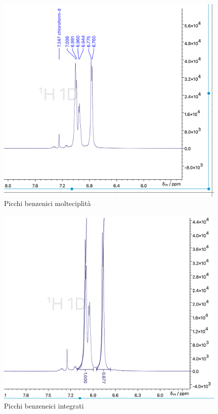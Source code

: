 \begin{figure}[h!]
    \centering
    \includegraphics[width=0.7\linewidth]{Relazione/foto/CoH_aromaticpeak_calc_zoom.png}
    \caption{Picchi benzenici molteciplità}
    \label{fig:coharomaticzoom}
\end{figure}

\begin{figure}[h!]
    \centering
    \includegraphics[width=0.7\linewidth]{Relazione/foto/CoH_aromaticpeak_right.png}
    \caption{Picchi benzeneici integrati }
    \label{fig:my_label}
\end{figure}


